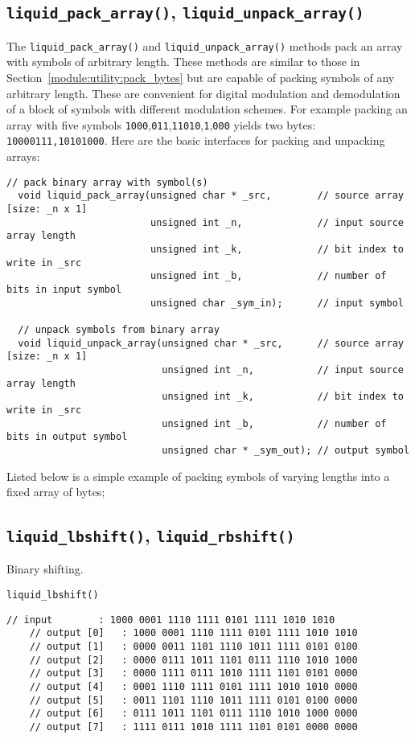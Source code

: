 \subsection{{\tt liquid\_pack\_array()},
            {\tt liquid\_unpack\_array()}}
\label{module:utility:pack_array}
%
The {\tt liquid\_pack\_array()} and {\tt liquid\_unpack\_array()}
methods pack an array with symbols of arbitrary length.
These methods are similar to those in
Section~\ref{module:utility:pack_bytes}
but are capable of packing symbols of any arbitrary length.
These are convenient for digital modulation and demodulation of a block
of symbols with different modulation schemes.
For example packing an array with five symbols
{\tt 1000},{\tt 011},{\tt 11010},{\tt 1},{\tt 000} yields two bytes:
{\tt 10000111,10101000}.
%
Here are the basic interfaces for packing and unpacking arrays:
\begin{Verbatim}[fontsize=\small]
  // pack binary array with symbol(s)
  void liquid_pack_array(unsigned char * _src,        // source array [size: _n x 1]
                         unsigned int _n,             // input source array length
                         unsigned int _k,             // bit index to write in _src
                         unsigned int _b,             // number of bits in input symbol
                         unsigned char _sym_in);      // input symbol

  // unpack symbols from binary array
  void liquid_unpack_array(unsigned char * _src,      // source array [size: _n x 1]
                           unsigned int _n,           // input source array length
                           unsigned int _k,           // bit index to write in _src
                           unsigned int _b,           // number of bits in output symbol
                           unsigned char * _sym_out); // output symbol
\end{Verbatim}
%
Listed below is a simple example of packing symbols of varying lengths
into a fixed array of bytes;
%

%


\subsection{{\tt liquid\_lbshift()},
            {\tt liquid\_rbshift()}}
\label{module:utility:bshift}
Binary shifting.

{\tt liquid\_lbshift()}
\begin{Verbatim}[fontsize=\small]
    // input        : 1000 0001 1110 1111 0101 1111 1010 1010
    // output [0]   : 1000 0001 1110 1111 0101 1111 1010 1010
    // output [1]   : 0000 0011 1101 1110 1011 1111 0101 0100
    // output [2]   : 0000 0111 1011 1101 0111 1110 1010 1000
    // output [3]   : 0000 1111 0111 1010 1111 1101 0101 0000
    // output [4]   : 0001 1110 1111 0101 1111 1010 1010 0000
    // output [5]   : 0011 1101 1110 1011 1111 0101 0100 0000
    // output [6]   : 0111 1011 1101 0111 1110 1010 1000 0000
    // output [7]   : 1111 0111 1010 1111 1101 0101 0000 0000
\end{Verbatim}

